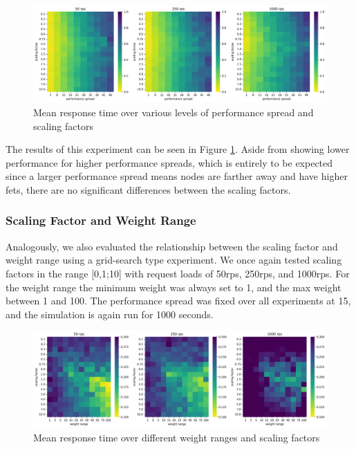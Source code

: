\begin{figure}
    \centering
    \includegraphics[width=14cm]{graphics/graphs/lb_hyper_scaling_vs_performance_spread_corrected.png}
    \caption{Mean response time over various levels of performance spread and scaling factors}
    \label{fig:lb_hyper_scaling_perfspread}
\end{figure}

The results of this experiment can be seen in Figure \ref{fig:lb_hyper_scaling_perfspread}.
Aside from showing lower performance for higher performance spreads, which is entirely to be expected since a larger performance spread means nodes are farther away and have higher \glspl{fet}, there are no significant differences between the scaling factors.

\subsubsection{Scaling Factor and Weight Range}
Analogously, we also evaluated the relationship between the scaling factor and weight range using a grid-search type experiment.
We once again tested scaling factors in the range [0,1;10] with request loads of 50\gls{rps}, 250\gls{rps}, and 1000\gls{rps}.
For the weight range the minimum weight was always set to 1, and the max weight between 1 and 100.
The performance spread was fixed over all experiments at 15, and the simulation is again run for 1000 seconds.

\begin{figure}
    \centering
    \includegraphics[width=14cm]{graphics/graphs/lb_hyper_scaling_vs_weight_range_corrected.png}
    \caption{Mean response time over different weight ranges and scaling factors}
    \label{fig:lb_hyper_weightrange_scaling}
\end{figure}

